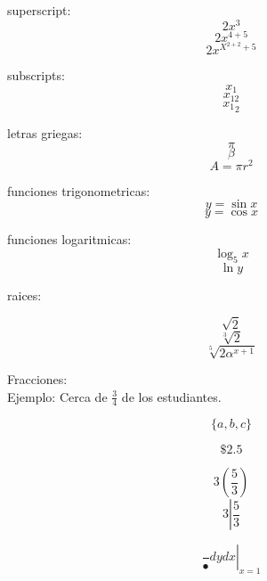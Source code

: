\documentclass[11pt]{article}
\begin{document}
superscript: $$2x^3$$
$$2x^{4+5}$$
$$2x^{X^{2+2}+5}$$

subscripts:
$$x_1$$
$$x_{12}$$
$${x_1}_2$$

letras griegas:
$$\pi$$
$$\beta$$
$$A=\pi r^2$$

funciones trigonometricas:
$$y=\sin{x}$$
$$y=\cos{x}$$

funciones logaritmicas:
$$\log_5{x}$$
$$\ln{y}$$

raices:

$$\sqrt{2}$$
$$\sqrt[3]{2}$$
$$\sqrt[5]{2\alpha^{x+1}}$$

Fracciones:\\
Ejemplo:	Cerca de $\displaystyle{\frac{3}{4}}$ de los estudiantes.

$$\{a,b,c\}$$

$$\$2.5$$

$$3\left(\frac{5}{3}\right)$$
$$3\left|\frac{5}{3}\right.$$

$$\left. \frac{}{•}{dy}{dx} \right|_{x=1}$$
\end{document}
